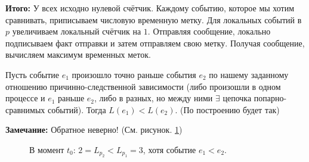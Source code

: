 
\textbf{Итого:} У всех исходно нулевой счётчик. Каждому событию, которое мы хотим сравнивать, приписываем числовую временную метку. Для локальных событий в $p$ увеличиваем локальный счётчик на $1$. Отправляя сообщение, локально подписываем факт отправки и затем отправляем свою метку. Получая сообщение, вычисляем максимум временных меток.

Пусть событие $e_1$ произошло точно раньше события $e_2$ по нашему заданному отношению причинно-следственной зависимости (либо произошли в одном процессе и $e_1$ раньше $e_2$, либо в разных, но между ними $\exists$ цепочка попарно-сравнимых событий).
Тогда $L(e_1) < L(e_2)$. (По построению будет так)

\textbf{Замечание:} Обратное неверно! (См. рисунок. \ref{fig:Image_comparsion})

\begin{figure}[H]
\caption{В момент $t_0$: $2 = L_{p_2} < L_{p_1} = 3$, хотя событие $e_1 < e_2$.} 
\label{fig:Image_comparsion}
\end{figure}
        
